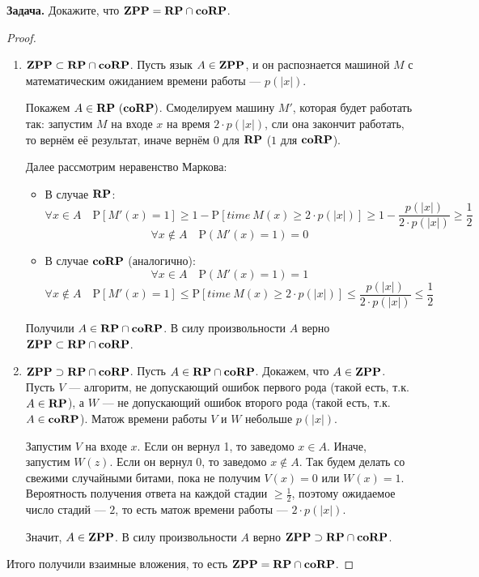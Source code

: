 \textbf{Задача.} Докажите, что $\textbf{ZPP} = \textbf{RP} \cap \textbf{coRP}$.

\begin{proof}
\begin{enumerate}
    \item $\textbf{ZPP} \subset \textbf{RP} \cap \textbf{coRP}$. Пусть язык $A \in \textbf{ZPP}$, и он распознается машиной $M$ с математическим ожиданием времени работы — $p(|x|)$.
    
    Покажем $A \in \textbf{RP} \ (\textbf{coRP})$. Смоделируем машину $M'$, которая будет работать так: запустим $M$ на входе $x$ на время $2\cdot p(|x|)$, сли она закончит работать, то вернём её результат, иначе вернём $0$ для $\textbf{RP}$ ($1$ для $\textbf{coRP}$).
    
    Далее рассмотрим неравенство Маркова:
    \begin{itemize}
        \item В случае $\textbf{RP}$:
        \[\forall x \in A \quad \mathrm{P}[M'(x)=1] \ge 1 - \mathrm{P}[time\ M(x) \ge 2 \cdot p(|x|)] \ge 1 - \frac{p(|x|)}{2 \cdot p(|x|)} \ge \frac{1}{2}\]
        \[\forall x \not\in A \quad \mathrm{P}(M'(x) = 1) = 0\]
    
        \item В случае $\textbf{coRP}$ (аналогично):
        \[\forall x \in A \quad \mathrm{P}(M'(x) = 1) = 1\]
        \[\forall x \not\in A \quad \mathrm{P}[M'(x) = 1] \le \mathrm{P}[time\ M(x) \ge 2 \cdot p(|x|)] \le \frac{p(|x|)}{2\cdot p(|x|)} \le \frac{1}{2}\]
    \end{itemize}

    Получили $A \in \textbf{RP} \cap \textbf{coRP}$. В силу произвольности $A$ верно $\textbf{ZPP}\subset\textbf{RP}\cap\textbf{coRP}$.

    \item $\textbf{ZPP} \supset \textbf{RP} \cap \textbf{coRP}$. Пусть $A \in \textbf{RP} \cap \textbf{coRP}$. Докажем, что $A \in \textbf{ZPP}$. Пусть $V$ --- алгоритм, не допускающий ошибок первого рода (такой есть, т.к. $A \in \textbf{RP}$), а $W$ --- не допускающий ошибок второго рода (такой есть, т.к. $A \in \textbf{coRP}$). Матож времени работы $V$ и $W$ небольше $p(|x|)$.
    
    Запустим $V$ на входе $x$. Если он вернул 1, то заведомо $x \in A$. Иначе, запустим $W(z)$. Если он вернул 0, то заведомо $x \not \in A$. Так будем делать со свежими случайными битами, пока не получим $V(x) = 0$ или $W(x) = 1$. Вероятность получения ответа на каждой стадии $\geq \frac{1}{2}$, поэтому ожидаемое число стадий --- $2$, то есть матож времени работы --- $2 \cdot p(|x|)$.
    
    Значит, $A \in \textbf{ZPP}$. В силу произвольности $A$ верно $\textbf{ZPP} \supset \textbf{RP} \cap \textbf{coRP}$.
\end{enumerate}

Итого получили взаимные вложения, то есть $\textbf{ZPP} = \textbf{RP} \cap \textbf{coRP}$.
\end{proof}
